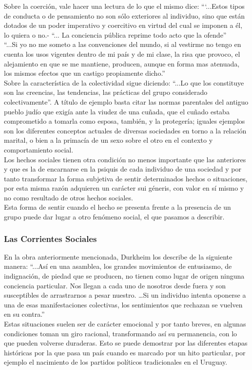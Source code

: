 Sobre la coerci\'on, vale hacer una lectura de lo que el mismo dice: ```...Estos tipos de conducta o de pensamiento no son s\'olo exteriores al individuo, sino que est\'an dotados de un poder imperativo y coercitivo en virtud del cual se imponen a \'el, lo quiera o no.- ``... La conciencia pública reprime todo acto que la ofende''\\
``...Si yo no me someto a las convenciones del mundo, si al vestirme no tengo en cuenta los usos vigentes dentro de mi país y de mi clase, la risa que provoco, el alejamiento en que se me mantiene, producen, aunque en forma mas atenuada, los mismos efectos que un castigo propiamente dicho.''\\
Sobre la característica de la colectividad sigue diciendo: ``...Lo que los constituye son las creencias, las tendencias, las prácticas del grupo considerado colectivamente''. A título de ejemplo basta citar las normas parentales del antiguo pueblo judío que exigía ante la viudez de una cuñada, que el cuñado estaba comprometido a tomarla como esposa, también, y la protegería; iguales ejemplos son los diferentes conceptos actuales de diversas sociedades en torno a la relación marital, o bien a la primacía de un sexo sobre el otro en el contexto y comportamiento social.\\
Los hechos sociales tienen otra condición no menos importante que las anteriores y que es la de encarnarse en la psiquis de cada individuo de una sociedad y por tanto transformar la forma subjetiva de sentir determinados hechos o situaciones, por esta misma razón adquieren un carácter sui géneris, con valor en sí mismo y no como resultado de otros hechos sociales.\\
Esta forma de sentir cuando el hecho se presenta frente a la presencia de un grupo puede dar lugar a otro fenómeno social, el que pasamos a describir.\\

\subsubsection{Las Corrientes Sociales}
En la obra anteriormente mencionada, Durkheim los describe de la siguiente manera: ``...Así en una asamblea, los grandes movimientos de entusiasmo, de indignación, de piedad que se producen, no tienen como lugar de origen ninguna conciencia particular. Nos llegan a cada uno de nosotros desde fuera y son susceptibles de arrastrarnos a pesar nuestro. …Si un individuo intenta oponerse a una de esas manifestaciones colectivas, los sentimientos que rechazan se vuelven en su contra.''\\
Estas situaciones suelen ser de carácter emocional y por tanto breves, en algunas condiciones toman un giro racional, transformando así su permanencia, con lo que pueden volverse duraderas. Esto se puede demostrar por las diferentes etapas históricas por la que pasa un país cuando es marcado por un hito particular, por ejemplo el nacimiento de los partidos políticos tradicionales en el Uruguay.\\

